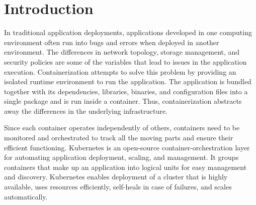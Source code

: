\documentclass[sigconf]{acmart}
\begin{document}



\maketitle

\section{Introduction}
In traditional application deployments, applications developed in one computing environment often run into bugs and errors when deployed in another environment. The differences in network topology, storage management, and security policies are some of the variables that lead to issues in the application execution. Containerization attempts to solve this problem by providing an isolated runtime environment to run the application. The application is  bundled together with its dependencies, libraries, binaries, and configuration files into a single package and is run inside a container. Thus, containerization abstracts away the differences in the underlying infrastructure.

Since each container operates independently of others, containers need to be monitored and orchestrated to track all the moving parts and ensure their efficient functioning. Kubernetes is an open-source container-orchestration layer for automating application deployment, scaling, and management. It groups containers that make up an application into logical units for easy management and discovery. Kubernetes enables deployment of a cluster that is highly available, uses resources efficiently, self-heals in case of failures, and scales automatically.
\end{document}
